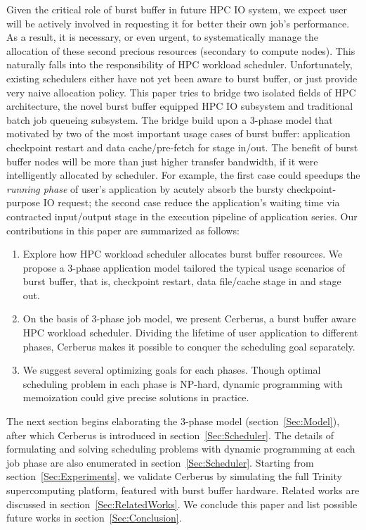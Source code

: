 Given the critical role of burst buffer in future HPC IO system,
we expect user will be actively involved in requesting it for
better their own job's performance.
As a result, it is necessary, or even urgent, to systematically manage
the allocation of these second precious resources (secondary to compute nodes).
This naturally falls into the responsibility of HPC workload scheduler.
Unfortunately, existing schedulers
either have not yet been aware to burst buffer\cite{Moab, other scheduler citation needed},
or just provide very naive allocation policy\cite{SlurmBBGuide}.
This paper tries to bridge two isolated fields of HPC architecture,
the novel burst buffer equipped HPC IO subsystem and
traditional batch job queueing subsystem.
The bridge build upon a 3-phase model that motivated by two of the most
important usage cases of burst buffer:
application checkpoint restart and data cache/pre-fetch for stage in/out.
The benefit of burst buffer nodes will be more than just higher transfer
bandwidth, if it were intelligently allocated by scheduler.
For example, the first case could speedups the \textit{running phase} of
user's application by acutely absorb the bursty checkpoint-purpose IO request;
the second case reduce the application's waiting time via
contracted input/output stage in the execution pipeline of application series.
Our contributions in this paper are summarized as follows:
\begin{enumerate}
        \item Explore how HPC workload scheduler allocates burst buffer resources.
                We propose a 3-phase application model tailored the typical
                usage scenarios of burst buffer, that is, checkpoint restart,
                data file/cache stage in and stage out.
        \item On the basis of 3-phase job model, we present Cerberus,
                a burst buffer aware HPC workload scheduler.
                Dividing the lifetime of user application to different phases,
                Cerberus makes it possible to conquer the scheduling goal separately.
        \item We suggest several optimizing goals for each phases.
                Though optimal scheduling problem in each phase is NP-hard,
                dynamic programming with memoization could give precise solutions
                in practice.
\end{enumerate}

The next section begins elaborating the 3-phase model (section~\ref{Sec:Model}),
after which Cerberus is introduced in section~\ref{Sec:Scheduler}.
The details of formulating and solving scheduling problems with
dynamic programming at each job phase are also
enumerated in section~\ref{Sec:Scheduler}.
Starting from section~\ref{Sec:Experiments}, we validate Cerberus
by simulating the full Trinity supercomputing platform, featured with
burst buffer hardware.
Related works are discussed in section~\ref{Sec:RelatedWorks}.
We conclude this paper and list possible future works in section~\ref{Sec:Conclusion}.





